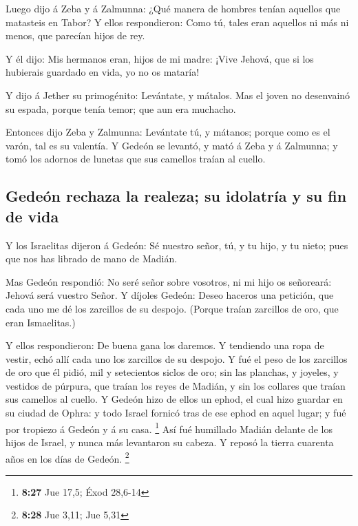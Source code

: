  Luego dijo á Zeba y á Zalmunna: ¿Qué manera de hombres
tenían aquellos que matasteis en Tabor? Y ellos respondieron: Como tú,
tales eran aquellos ni más ni menos, que parecían hijos de rey.

 Y él dijo: Mis hermanos eran, hijos de mi madre: ¡Vive
Jehová, que si los hubierais guardado en vida, yo no os mataría!

 Y dijo á Jether su primogénito: Levántate, y mátalos. Mas
el joven no desenvainó su espada, porque tenía temor; que aun era
muchacho.

 Entonces dijo Zeba y Zalmunna: Levántate tú, y mátanos;
porque como es el varón, tal es su valentía. Y Gedeón se levantó, y mató
á Zeba y á Zalmunna; y tomó los adornos de lunetas que sus camellos
traían al cuello.

\hypertarget{gedeuxf3n-rechaza-la-realeza-su-idolatruxeda-y-su-fin-de-vida}{%
\subsection{Gedeón rechaza la realeza; su idolatría y su fin de
vida}\label{gedeuxf3n-rechaza-la-realeza-su-idolatruxeda-y-su-fin-de-vida}}

 Y los Israelitas dijeron á Gedeón: Sé nuestro señor, tú, y
tu hijo, y tu nieto; pues que nos has librado de mano de Madián.

 Mas Gedeón respondió: No seré señor sobre vosotros, ni mi
hijo os señoreará: Jehová será vuestro Señor.  Y díjoles
Gedeón: Deseo haceros una petición, que cada uno me dé los zarcillos de
su despojo. (Porque traían zarcillos de oro, que eran Ismaelitas.)

 Y ellos respondieron: De buena gana los daremos. Y
tendiendo una ropa de vestir, echó allí cada uno los zarcillos de su
despojo.  Y fué el peso de los zarcillos de oro que él
pidió, mil y setecientos siclos de oro; sin las planchas, y joyeles, y
vestidos de púrpura, que traían los reyes de Madián, y sin los collares
que traían sus camellos al cuello.  Y Gedeón hizo de ellos
un ephod, el cual hizo guardar en su ciudad de Ophra: y todo Israel
fornicó tras de ese ephod en aquel lugar; y fué por tropiezo á Gedeón y
á su casa. \footnote{\textbf{8:27} Jue 17,5; Éxod 28,6-14} 
Así fué humillado Madián delante de los hijos de Israel, y nunca más
levantaron su cabeza. Y reposó la tierra cuarenta años en los días de
Gedeón. \footnote{\textbf{8:28} Jue 3,11; Jue 5,31}

